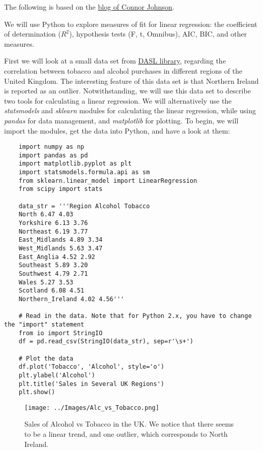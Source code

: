 The following is based on the \href{http://connor-johnson.com/2014/02/18/linear-regression-with-python/}{blog of Connor Johnson}.

We will use Python to explore measures of fit for linear regression: the coefficient of determination ($R^2$), hypothesis tests (F, t, Omnibus), AIC, BIC, and other measures.

First we will look at a small data set from \href{http://lib.stat.cmu.edu/DASL/Stories/AlcoholandTobacco.html}{DASL library}, regarding the correlation between tobacco and alcohol purchases in different regions of the United Kingdom. The interesting feature of this data set is that Northern Ireland is reported as an outlier. Notwithstanding, we will use this data set to describe two tools for calculating a linear regression. We will alternatively use the \emph{statsmodels} and \emph{sklearn} modules for calculating the linear regression, while using \emph{pandas} for data management, and \emph{matplotlib} for plotting. To begin, we will import the modules, get the data into Python, and have a look at them:

\begin{lstlisting}
    import numpy as np
    import pandas as pd
    import matplotlib.pyplot as plt
    import statsmodels.formula.api as sm
    from sklearn.linear_model import LinearRegression
    from scipy import stats

    data_str = '''Region Alcohol Tobacco
    North 6.47 4.03
    Yorkshire 6.13 3.76
    Northeast 6.19 3.77
    East_Midlands 4.89 3.34
    West_Midlands 5.63 3.47
    East_Anglia 4.52 2.92
    Southeast 5.89 3.20
    Southwest 4.79 2.71
    Wales 5.27 3.53
    Scotland 6.08 4.51
    Northern_Ireland 4.02 4.56'''

    # Read in the data. Note that for Python 2.x, you have to change the "import" statement
    from io import StringIO
    df = pd.read_csv(StringIO(data_str), sep=r'\s+')

    # Plot the data
    df.plot('Tobacco', 'Alcohol', style='o')
    plt.ylabel('Alcohol')
    plt.title('Sales in Several UK Regions')
    plt.show()
\end{lstlisting}

\begin{figure}
  \centering
  \texttt{[image: ../Images/Alc\_vs\_Tobacco.png]}\\
  \caption{Sales of Alcohol vs Tobacco in the UK. We notice that there seems to be a linear trend, and one outlier, which corresponds to North Ireland.}
\end{figure}


